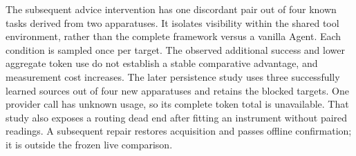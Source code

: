 \documentclass[11pt,a4paper]{article}
\begin{document}
The subsequent advice intervention has one discordant pair out of four known
tasks derived from two apparatuses. It isolates visibility within the shared
tool environment, rather than the complete framework versus a vanilla Agent.
Each condition is sampled once per target. The observed additional success and
lower aggregate token use do not establish a stable comparative advantage, and
measurement cost increases. The later persistence study uses three successfully
learned sources out of four new apparatuses and retains the blocked targets.
One provider call has unknown usage, so its complete token total is unavailable.
That study also exposes a routing dead end after fitting an instrument without
paired readings. A subsequent repair restores acquisition and passes offline
confirmation; it is outside the frozen live comparison.
\end{document}
